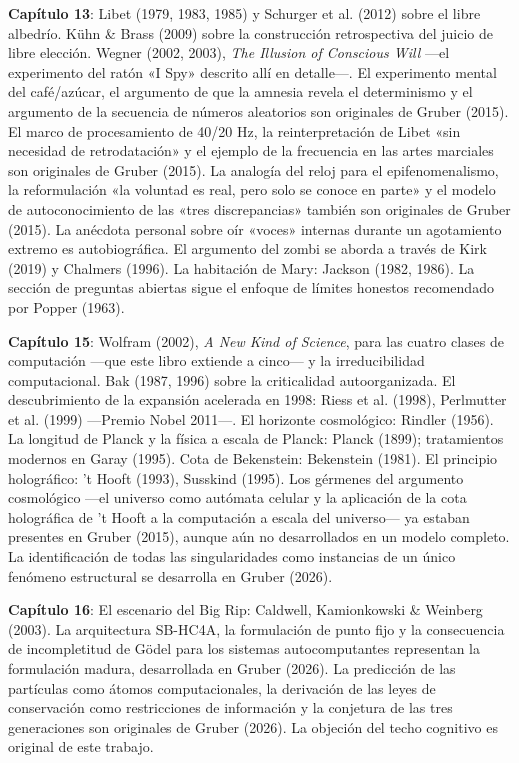 \documentclass[11pt, twoside, openright]{book}
\begin{document}
\textbf{Capítulo 13}: Libet (1979, 1983, 1985) y Schurger et al. (2012) sobre el libre albedrío. Kühn \& Brass (2009) sobre la construcción retrospectiva del juicio de libre elección. Wegner (2002, 2003), \textit{The Illusion of Conscious Will} ---el experimento del ratón «I Spy» descrito allí en detalle---. El experimento mental del café/\allowbreak{}azúcar, el argumento de que la amnesia revela el determinismo y el argumento de la secuencia de números aleatorios son originales de Gruber (2015). El marco de procesamiento de 40/\allowbreak{}20 Hz, la reinterpretación de Libet «sin necesidad de retrodatación» y el ejemplo de la frecuencia en las artes marciales son originales de Gruber (2015). La analogía del reloj para el epifenomenalismo, la reformulación «la voluntad es real, pero solo se conoce en parte» y el modelo de autoconocimiento de las «tres discrepancias» también son originales de Gruber (2015). La anécdota personal sobre oír «voces» internas durante un agotamiento extremo es autobiográfica. El argumento del zombi se aborda a través de Kirk (2019) y Chalmers (1996). La habitación de Mary: Jackson (1982, 1986). La sección de preguntas abiertas sigue el enfoque de límites honestos recomendado por Popper (1963).

\textbf{Capítulo 15}: Wolfram (2002), \textit{A New Kind of Science}, para las cuatro clases de computación ---que este libro extiende a cinco--- y la irreducibilidad computacional. Bak (1987, 1996) sobre la criticalidad autoorganizada. El descubrimiento de la expansión acelerada en 1998: Riess et al. (1998), Perlmutter et al. (1999) ---Premio Nobel 2011---. El horizonte cosmológico: Rindler (1956). La longitud de Planck y la física a escala de Planck: Planck (1899); tratamientos modernos en Garay (1995). Cota de Bekenstein: Bekenstein (1981). El principio holográfico: 't Hooft (1993), Susskind (1995). Los gérmenes del argumento cosmológico ---el universo como autómata celular y la aplicación de la cota holográfica de 't Hooft a la computación a escala del universo--- ya estaban presentes en Gruber (2015), aunque aún no desarrollados en un modelo completo. La identificación de todas las singularidades como instancias de un único fenómeno estructural se desarrolla en Gruber (2026).

\textbf{Capítulo 16}: El escenario del Big Rip: Caldwell, Kamionkowski \& Weinberg (2003). La arquitectura SB-HC4A, la formulación de punto fijo y la consecuencia de incompletitud de Gödel para los sistemas autocomputantes representan la formulación madura, desarrollada en Gruber (2026). La predicción de las partículas como átomos computacionales, la derivación de las leyes de conservación como restricciones de información y la conjetura de las tres generaciones son originales de Gruber (2026). La objeción del techo cognitivo es original de este trabajo.
\end{document}
